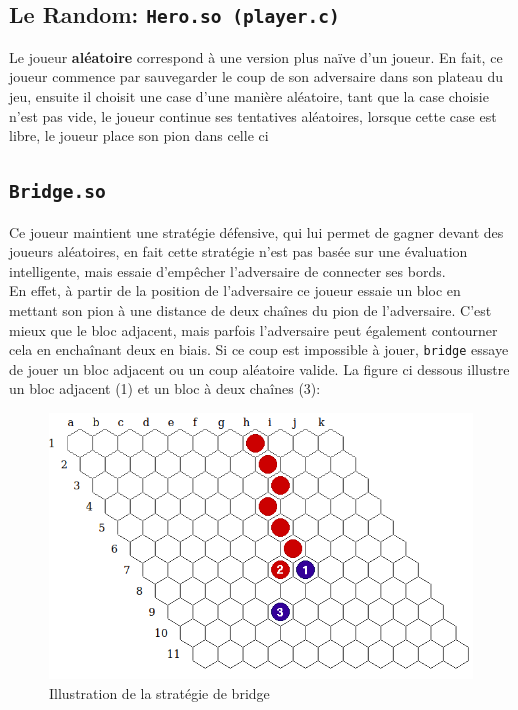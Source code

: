 \documentclass[a4paper,10pt]{article}
\begin{document}
\subsection{Le Random: \texttt{Hero.so (player.c)}}
Le joueur \textbf{aléatoire} correspond à une version plus naïve d'un joueur. En fait, ce joueur commence par sauvegarder le coup de son adversaire dans son plateau du jeu, ensuite il choisit une case d'une manière aléatoire, tant que la case choisie n'est pas vide, le joueur continue ses tentatives aléatoires, lorsque cette case est libre, le joueur place son pion dans celle ci
\subsection{\texttt{Bridge.so}} Ce joueur maintient une stratégie défensive, qui lui permet de gagner devant des joueurs aléatoires, en fait cette stratégie n'est pas basée sur une évaluation intelligente, mais essaie d'empêcher l'adversaire de connecter ses bords.\\ En effet, à partir de la position de l'adversaire ce joueur essaie un bloc en mettant son pion à une distance de deux chaînes du pion de l'adversaire. C'est mieux que le bloc adjacent, mais parfois l'adversaire peut également contourner cela en enchaînant deux en biais. Si ce coup est impossible à jouer, \texttt{bridge} essaye de jouer un bloc adjacent ou un coup aléatoire valide. La figure ci dessous illustre un bloc adjacent (1) et un bloc à deux chaînes (3):\\
\begin{figure}[h]
\begin{center}
    \includegraphics[scale=0.4]{bridge.png}
        \caption{Illustration de la stratégie de bridge}
    \label{fig:bridge}
\end{center}
\end{figure}\\
\end{document}
